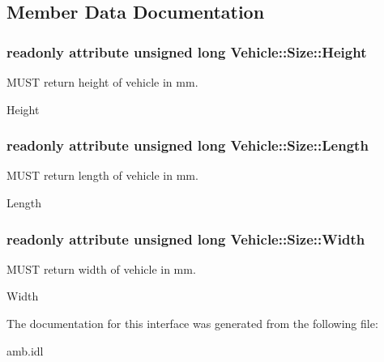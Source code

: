 \subsection{Member Data Documentation}
\hypertarget{interfaceVehicle_1_1Size_a011b39b5ca3b37c1f71662b6dcf72e10}{
\subsubsection[{Height}]{\setlength{\rightskip}{0pt plus 5cm}readonly attribute unsigned long Vehicle\-::\-Size\-::\-Height}}\label{interfaceVehicle_1_1Size_a011b39b5ca3b37c1f71662b6dcf72e10}


M\-U\-S\-T return height of vehicle in mm. 

Height \hypertarget{interfaceVehicle_1_1Size_a228ef4095ed8c5b07159d520d0bdb99a}{
\subsubsection[{Length}]{\setlength{\rightskip}{0pt plus 5cm}readonly attribute unsigned long Vehicle\-::\-Size\-::\-Length}}\label{interfaceVehicle_1_1Size_a228ef4095ed8c5b07159d520d0bdb99a}


M\-U\-S\-T return length of vehicle in mm. 

Length \hypertarget{interfaceVehicle_1_1Size_ad62490f0d79e1d9153aa66ae3bb62d97}{
\subsubsection[{Width}]{\setlength{\rightskip}{0pt plus 5cm}readonly attribute unsigned long Vehicle\-::\-Size\-::\-Width}}\label{interfaceVehicle_1_1Size_ad62490f0d79e1d9153aa66ae3bb62d97}


M\-U\-S\-T return width of vehicle in mm. 

Width 

The documentation for this interface was generated from the following file\-:\begin{DoxyCompactItemize}
\item 
amb.\-idl\end{DoxyCompactItemize}
